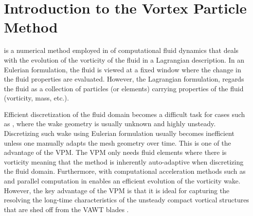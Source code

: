 

\section{Introduction to the Vortex Particle Method}
 is a numerical method employed in of computational fluid dynamics that deals with the evolution of the vorticity of the fluid in a Lagrangian description. In an Eulerian formulation, the fluid is viewed at a fixed window where the change in the fluid properties are evaluated. However, the Lagrangian formulation, regards the fluid as a collection of particles (or elements) carrying properties of the fluid (vorticity, mass, etc.). 

Efficient discretization of the fluid domain becomes a difficult task for cases such as , where the wake geometry is usually unknown and highly unsteady. Discretizing such wake using Eulerian formulation usually becomes inefficient unless one manually adapts the mesh geometry over time. This is one of the advantage of the VPM. The VPM only needs fluid elements where there is vorticity meaning that the method is inherently auto-adaptive when discretizing the fluid domain. Furthermore, with computational acceleration methods such as  and parallel computation in  enables an efficient evolution of the vorticity wake. However, the key advantage of the VPM is that it is ideal for capturing the resolving the long-time characteristics of the unsteady compact vortical structures that are shed off from the VAWT blades \cite{Stock2010a}.

